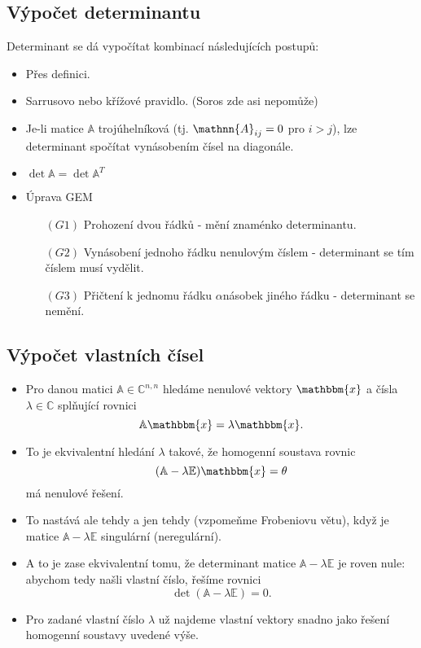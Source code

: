 \documentclass{szzclass}
\begin{document}
\subsection{Výpočet determinantu}
Determinant se dá vypočítat kombinací následujících postupů:
\begin{itemize}
\item Přes definici.
\item Sarrusovo nebo křížové pravidlo. (Soros zde asi nepomůže)
\item Je-li matice $\mathbb{A}$ trojúhelníková (tj. $\mathnn{A}_{ij} = 0$ pro $i > j$), lze determinant spočítat vynásobením čísel na diagonále.
\item $\det{\mathbb{A}}=\det{\mathbb{A}^T}$
\item Úprava GEM
  \begin{itemize}
  \item[$(G1)$] Prohození dvou řádků - mění znaménko determinantu.
  \item[$(G2)$] Vynásobení jednoho řádku nenulovým číslem - determinant se tím číslem musí vydělit.
  \item[$(G3)$] Přičtení k jednomu řádku $\alpha$násobek jiného řádku - determinant se nemění.
  \end{itemize}
\end{itemize}

\subsection{Výpočet vlastních čísel}

\begin{itemize}
\item Pro danou matici $\mathbb{A} \in \mathbb{C}^{n,n}$ hledáme nenulové vektory $\mathbbm{x}$ a čísla $\lambda\in\mathbb{C}$ splňující rovnici
\[
  \mathbb{A}\mathbbm{x} = \lambda \mathbbm{x}.
\]
\item To je ekvivalentní hledání $\lambda$ takové, že homogenní soustava rovnic
\[
  (\mathbb{A} - \lambda \mathbb{E})\mathbbm{x} = \theta
\]
má nenulové řešení.
\item To nastává ale tehdy a jen tehdy (vzpomeňme Frobeniovu větu), když je matice $\mathbb{A} - \lambda \mathbb{E}$ singulární (neregulární).
\item A to je zase ekvivalentní tomu, že determinant matice $\mathbb{A} - \lambda \mathbb{E}$ je roven nule: abychom tedy našli vlastní číslo, řešíme rovnici
\[
  \det(\mathbb{A} - \lambda \mathbb{E}) = 0.
\]
\item Pro zadané vlastní číslo $\lambda$ už najdeme vlastní vektory snadno jako řešení homogenní soustavy uvedené výše.
\end{itemize}
\end{document}
